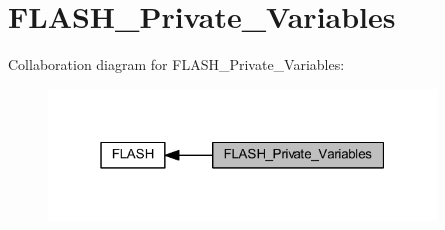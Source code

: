 \hypertarget{group___f_l_a_s_h___private___variables}{}\section{F\+L\+A\+S\+H\+\_\+\+Private\+\_\+\+Variables}
\label{group___f_l_a_s_h___private___variables}
Collaboration diagram for F\+L\+A\+S\+H\+\_\+\+Private\+\_\+\+Variables\+:
\nopagebreak
\begin{figure}[H]
\begin{center}
\leavevmode
\includegraphics[width=292pt]{group___f_l_a_s_h___private___variables}
\end{center}
\end{figure}
